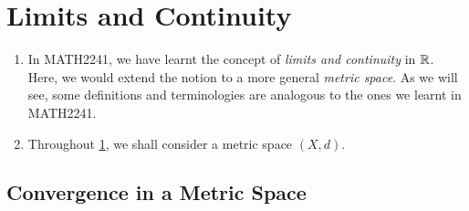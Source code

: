 \section{Limits and Continuity}
\label{sect:limits-and-cont}
\begin{enumerate}
\item In MATH2241, we have learnt the concept of \emph{limits and continuity}
in \(\mathbb{R}\). Here, we would extend the notion to a more general \emph{metric
space}. As we will see, some definitions and terminologies are analogous to the
ones we learnt in MATH2241.
\item Throughout \cref{sect:limits-and-cont}, we shall consider a metric space
\((X,d)\).
\end{enumerate}
\subsection{Convergence in a Metric Space}
